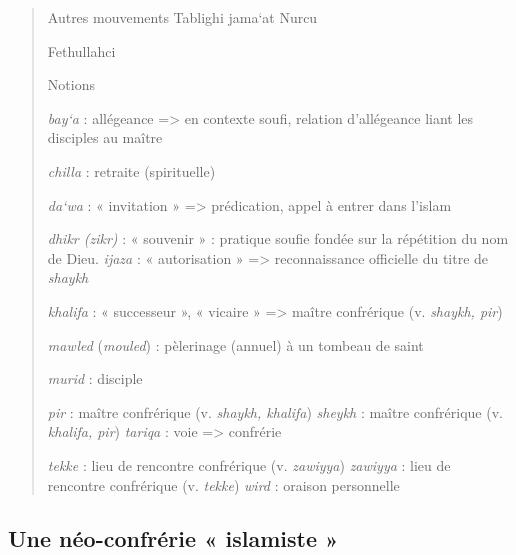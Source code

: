 \begin{quote}
{Autres mouvements} Tablighi jama`at Nurcu

Fethullahci

{Notions}

\emph{bay`a} : allégeance =\textgreater{} en contexte soufi, relation
d'allégeance liant les disciples au maître

\emph{chilla} : retraite (spirituelle)

\emph{da`wa} : « invitation » =\textgreater{} prédication, appel à
entrer dans l'islam

\emph{dhikr (zikr)} : « souvenir » : pratique soufie fondée sur la
répétition du nom de Dieu. \emph{ijaza} : « autorisation »
=\textgreater{} reconnaissance officielle du titre de \emph{shaykh}

\emph{khalifa} : « successeur », « vicaire » =\textgreater{} maître
confrérique (v. \emph{shaykh, pir})

\emph{mawled} (\emph{mouled}) : pèlerinage (annuel) à un tombeau de
saint

\emph{murid} : disciple

\emph{pir} : maître confrérique (v. \emph{shaykh, khalifa})
\emph{sheykh} : maître confrérique (v. \emph{khalifa, pir})
\emph{tariqa} : voie =\textgreater{} confrérie

\emph{tekke} : lieu de rencontre confrérique (v. \emph{zawiyya})
\emph{zawiyya} : lieu de rencontre confrérique (v. \emph{tekke})
\emph{wird} : oraison personnelle
\end{quote}

\hypertarget{une-nuxe9o-confruxe9rie-islamiste}{%
\subsection{\texorpdfstring{{Une néo-confrérie « islamiste
»}}{Une néo-confrérie « islamiste »}}\label{une-nuxe9o-confruxe9rie-islamiste}}

